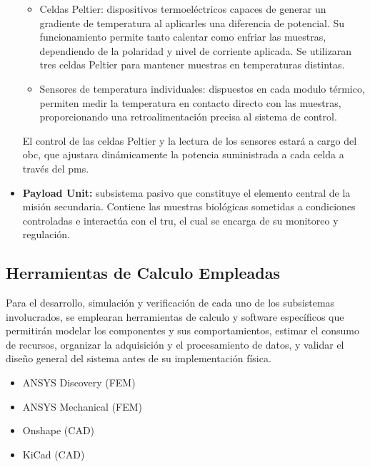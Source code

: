 \begin{itemize}
      \begin{itemize}
        \item Celdas Peltier: dispositivos termoeléctricos capaces de generar un gradiente de
          temperatura al aplicarles una diferencia de potencial. Su funcionamiento permite
          tanto calentar como enfriar las muestras, dependiendo de la polaridad y nivel de
          corriente aplicada. Se utilizaran tres celdas Peltier para mantener muestras en
          temperaturas distintas.

        \item Sensores de temperatura individuales: dispuestos en cada modulo térmico, permiten medir la
          temperatura en contacto directo con las muestras, proporcionando
            una retroalimentación precisa al sistema de control.
      \end{itemize}

      El control de las celdas Peltier y la lectura de los sensores estará a cargo del \acrshort{obc}, que
      ajustara dinámicamente la potencia suministrada a cada celda a través del \acrshort{pms}.

      \item \textbf{Payload Unit:}
      subsistema pasivo que constituye el elemento central de la misión secundaria. Contiene las muestras biológicas 
      sometidas a condiciones controladas e interactúa con el \acrshort{tru}, el cual se encarga de su monitoreo y
      regulación.


    \end{itemize}

  \subsection{Herramientas de Calculo Empleadas}
    Para el desarrollo, simulación y verificación de cada uno de los subsistemas involucrados,
    se emplearan herramientas de calculo y software específicos que permitirán modelar los componentes
    y sus comportamientos, estimar el consumo de recursos, organizar la adquisición y
    el procesamiento de datos, y validar el diseño general del sistema antes de su implementación
    física.

    \begin{itemize}
      \item ANSYS Discovery (FEM)
      \item ANSYS Mechanical (FEM)
      \item Onshape (CAD)
      \item KiCad (CAD)
    \end{itemize}


